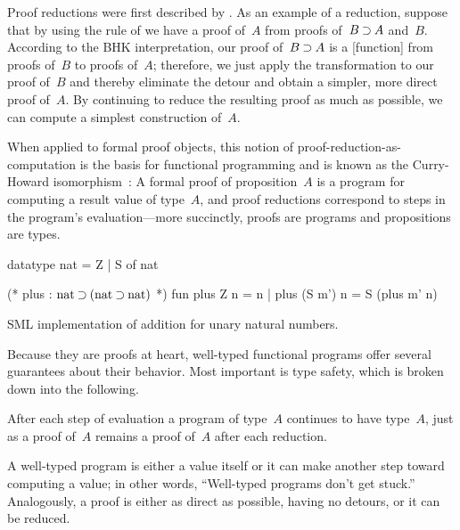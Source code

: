 Proof reductions were first described by \textcites{Gentzen:MZ35}{Prawitz:65}.
As an example of a reduction, suppose that by using the rule of  we have a proof of~$A$ from proofs of~$B \mathbin{\supset} A$ and~$B$.
According to the \ac{BHK} interpretation, our proof of~$B \mathbin{\supset} A$ is a [function] from proofs of~$B$ to proofs of~$A$; therefore,
we just apply the transformation to our proof of~$B$ and thereby eliminate the  detour and obtain a simpler, more direct proof of~$A$.
By continuing to reduce the resulting proof as much as possible, we can compute a simplest construction of~$A$.

When applied to formal proof objects, this notion of proof-reduction-as-computation is the basis for functional programming and is known as the Curry-Howard isomorphism~\autocites{Howard:Curry80}{Martin-Lof:LMPS80}:
A formal proof of proposition~$A$ is a program for computing a result value of type~$A$, and proof reductions correspond to steps in the program's evaluation---more succinctly, proofs are programs and propositions are types.

\begin{listing}[!t]
  \begin{pyglist}[language=sml, gobble=4, texcl=true]
    datatype nat = Z | S of nat
  
    (* plus : $\text{nat} \imp (\text{nat} \imp \text{nat})$ *) 
    fun plus Z n = n
      | plus (S m') n = S (plus m' n)
  \end{pyglist}
  \caption{\ac{SML} implementation of addition for unary natural numbers.\label{lst:smlplus}}
\end{listing}

Because they are proofs at heart, well-typed functional programs offer several guarantees about their behavior.
Most important is type safety, which is broken down into the following.
\begin{description}[font=\normalfont\itshape]
\item[Type preservation.]
  After each step of evaluation a program of type~$A$ continues to have type~$A$, just as a proof of~$A$ remains a proof of~$A$ after each reduction.
%
\item[Progress.]
  A well-typed program is either a value itself or it can make another step toward computing a value; in other words, \enquote{Well-typed programs don't get stuck.}
  Analogously, a proof is either as direct as possible, having no detours, or it can be reduced.
%
\end{description}

